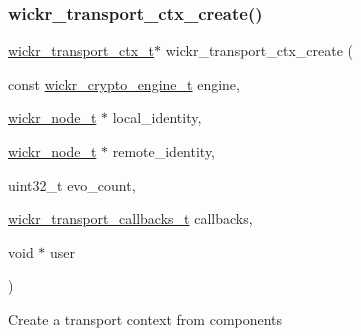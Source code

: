\subsubsection{\texorpdfstring{wickr\+\_\+transport\+\_\+ctx\+\_\+create()}{wickr\_transport\_ctx\_create()}}
{\footnotesize\ttfamily \hyperlink{structwickr__transport__ctx}{wickr\+\_\+transport\+\_\+ctx\+\_\+t}$\ast$ wickr\+\_\+transport\+\_\+ctx\+\_\+create (\begin{DoxyParamCaption}\item[{const \hyperlink{structwickr__crypto__engine}{wickr\+\_\+crypto\+\_\+engine\+\_\+t}}]{engine,  }\item[{\hyperlink{structwickr__node}{wickr\+\_\+node\+\_\+t} $\ast$}]{local\+\_\+identity,  }\item[{\hyperlink{structwickr__node}{wickr\+\_\+node\+\_\+t} $\ast$}]{remote\+\_\+identity,  }\item[{uint32\+\_\+t}]{evo\+\_\+count,  }\item[{\hyperlink{structwickr__transport__callbacks}{wickr\+\_\+transport\+\_\+callbacks\+\_\+t}}]{callbacks,  }\item[{void $\ast$}]{user }\end{DoxyParamCaption})}

Create a transport context from components


